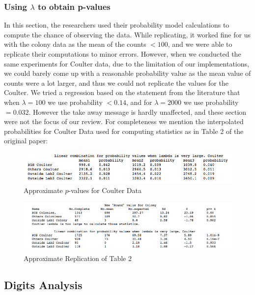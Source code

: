 \documentclass{article}
\begin{document}
    \subsubsection{Using $\lambda$ to obtain
p-values}\label{using-lambda-to-obtain-p-values}

In this section, the researchers used their probability model calculations to compute the chance of observing the data. While replicating,
it worked fine for us with the colony data as the mean of the counts $<100$, and we were able to replicate their computations to minor errors. However, when we conducted the same experiments for Coulter data, due to the limitation of our implementations, we could barely come up with a reasonable probability value as the mean value of counts were a lot larger, and thus we could not replicate the values for the Coulter. We tried a regression based on the statement from the
literature that when $\lambda = 100$ we use probability $<0.14$, and for $\lambda = 2000$ we use probability $= 0.032$. However the take away message is hardly unaffected, and these section were not the focus of our review. For completeness we mention the interpolated probabilities for Coulter Data used for computing statistics as in Table 2 of the original paper:

\begin{figure}[H]
\centering
\includegraphics[width=0.9\linewidth]{images/Lambda_Coulter.png}
\caption{Approximate $p$-values for Coulter Data}
\end{figure}

\begin{figure}[H]
\centering
\includegraphics[width=0.9\linewidth]{images/HT_Stat_values.png}
\caption{Approximate Replication of Table 2}
\end{figure}

    \subsection{Digits Analysis}\label{digits-analysis}
\end{document}
